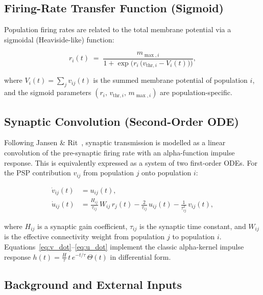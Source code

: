 \documentclass[12pt, a4paper]{article}
\begin{document}
\subsection{Firing-Rate Transfer Function (Sigmoid)}

Population firing rates are related to the total membrane potential via a
sigmoidal (Heaviside-like) function:

\begin{equation}
    r_i(t) \;=\; \frac{m_{\max,i}}{1 + \exp\!\bigl(r_i\,\bigl(v_{\text{thr},i} - V_i(t)\bigr)\bigr)},
    \label{eq:sigmoid}
\end{equation}

\noindent where $V_i(t) = \sum_{j} v_{ij}(t)$ is the summed membrane potential of
population $i$, and the sigmoid parameters $(r_i,\, v_{\text{thr},i},\, m_{\max,i})$
are population-specific.

\subsection{Synaptic Convolution (Second-Order ODE)}

Following Jansen \& Rit~\cite{JansenRit1995}, synaptic transmission is modelled as
a linear convolution of the pre-synaptic firing rate with an alpha-function impulse
response.  This is equivalently expressed as a system of two first-order ODEs.  For
the PSP contribution $v_{ij}$ from population $j$ onto population $i$:

\begin{align}
    \dot{v}_{ij}(t) &= u_{ij}(t), \label{eq:v_dot}\\[4pt]
    \dot{u}_{ij}(t) &= \frac{H_{ij}}{\tau_{ij}}\,W_{ij}\,r_j(t)
                      - \frac{2}{\tau_{ij}}\,u_{ij}(t)
                      - \frac{1}{\tau_{ij}^2}\,v_{ij}(t), \label{eq:u_dot}
\end{align}

\noindent where $H_{ij}$ is a synaptic gain coefficient, $\tau_{ij}$ is the synaptic
time constant, and $W_{ij}$ is the effective connectivity weight from population $j$
to population $i$.  Equations~\eqref{eq:v_dot}--\eqref{eq:u_dot} implement the
classic alpha-kernel impulse response
$h(t) = \frac{H}{\tau}\,t\,e^{-t/\tau}\,\Theta(t)$
in differential form.

\subsection{Background and External Inputs}
\end{document}
